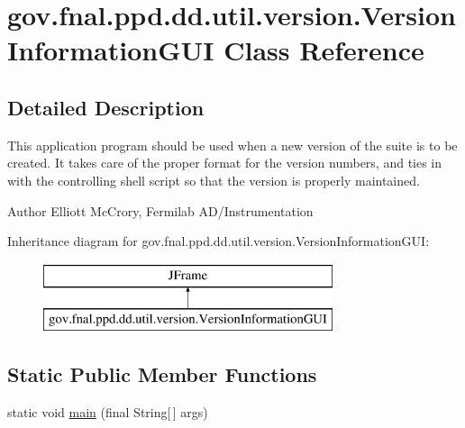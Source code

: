 \hypertarget{classgov_1_1fnal_1_1ppd_1_1dd_1_1util_1_1version_1_1VersionInformationGUI}{\section{gov.\-fnal.\-ppd.\-dd.\-util.\-version.\-Version\-Information\-G\-U\-I Class Reference}
\label{classgov_1_1fnal_1_1ppd_1_1dd_1_1util_1_1version_1_1VersionInformationGUI}
}


\subsection{Detailed Description}
This application program should be used when a new version of the suite is to be created. It takes care of the proper format for the version numbers, and ties in with the controlling shell script so that the version is properly maintained. 

\begin{DoxyAuthor}{Author}
Elliott Mc\-Crory, Fermilab A\-D/\-Instrumentation 
\end{DoxyAuthor}
Inheritance diagram for gov.\-fnal.\-ppd.\-dd.\-util.\-version.\-Version\-Information\-G\-U\-I\-:\begin{figure}[H]
\begin{center}
\leavevmode
\includegraphics[height=2.000000cm]{classgov_1_1fnal_1_1ppd_1_1dd_1_1util_1_1version_1_1VersionInformationGUI}
\end{center}
\end{figure}
\subsection*{Static Public Member Functions}
\begin{DoxyCompactItemize}
\item 
static void \hyperlink{classgov_1_1fnal_1_1ppd_1_1dd_1_1util_1_1version_1_1VersionInformationGUI_af31ef0bbe7ac5b7acc1a2b0860714270}{main} (final String\mbox{[}$\,$\mbox{]} args)
\end{DoxyCompactItemize}



